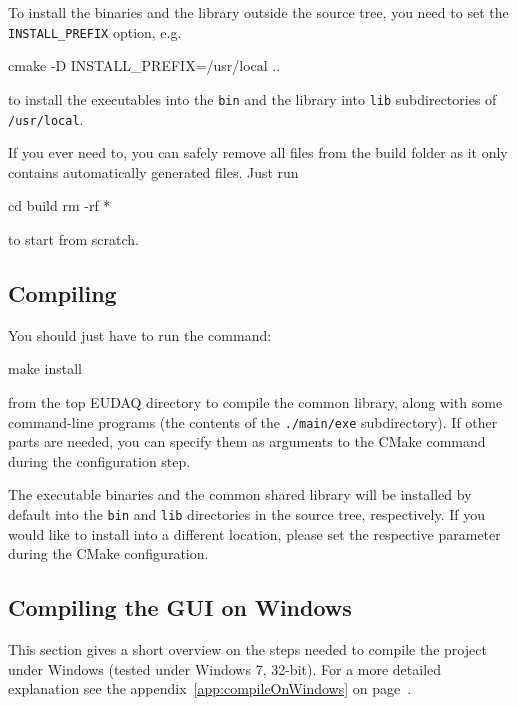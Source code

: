 To install the binaries and the library outside the source tree, you
need to set the \texttt{INSTALL\_PREFIX} option, e.g.
\begin{listing}[mybash]
cmake -D INSTALL_PREFIX=/usr/local ..
\end{listing}
to install the executables into the \texttt{bin} and the library into \texttt{lib} subdirectories of \texttt{/usr/local}.

If you ever need to, you can safely remove all files from the build folder
as it only contains automatically generated files. Just run
\begin{listing}[mybash]
cd build
rm -rf *
\end{listing}
to start from scratch.


\subsection{Compiling}
You should just have to run the command:
\begin{listing}[mybash]
make install
\end{listing}

from the top EUDAQ directory to compile the common library,
along with some command-line programs (the contents of the \texttt{./main/exe} subdirectory).
If other parts are needed, you can specify them as arguments to the
CMake command during the configuration step.

The executable binaries and the common shared library will be installed by default into the
\texttt{bin} and \texttt{lib} directories in the source tree,
respectively. If you would like to install into a different location,
please set the respective parameter during the CMake configuration.

\subsection{Compiling the GUI on Windows}

This section gives a short overview on the steps needed to compile the project under
Windows (tested under Windows 7, 32-bit). For a more detailed
explanation see the appendix~\ref{app:compileOnWindows} on page~\pageref{app:compileOnWindows}.

